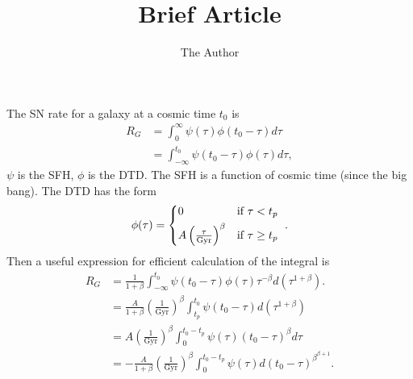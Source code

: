 \documentclass[11pt, oneside]{article}   	%
\title{Brief Article}
\author{The Author}
\begin{document}
\maketitle
The SN rate for a galaxy at a cosmic time $t_0$ is
\begin{align}
R_G &= \int_{0}^{\infty} \psi(\tau) \phi(t_0-\tau) d\tau \\
 &= \int_{-\infty}^{t_0} \psi(t_0-\tau) \phi(\tau) d\tau,
\end{align}
$\psi$ is the SFH, $\phi$ is the DTD. 
The SFH is a function of cosmic time (since the big bang).
The DTD has the form
\begin{equation}
\phi(\tau) =  
\begin{cases*} 
            0  &  if $\tau < t_p$  \\
             A \left(\frac{\tau}{\mathrm{Gyr}} \right)^\beta  & if $\tau \geq t_p$ 
          \end{cases*}.
\end{equation}
Then a useful expression for efficient calculation of the integral is
\begin{align}
R_G &= \frac{1}{1+\beta}  \int_{-\infty}^{t_0} \psi(t_0-\tau)  \phi(\tau)\tau^{-\beta}  d(\tau^{1+\beta}). \\
 &= \frac{A}{1+\beta}  \left(\frac{1}{\mathrm{Gyr}} \right)^\beta \int_{t_p}^{t_0} \psi(t_0-\tau) d(\tau^{1+\beta}) \\
 & = A   \left(\frac{1}{\mathrm{Gyr}} \right)^\beta  \int_{0}^{t_0-t_p} \psi(\tau) (t_0-\tau)^{\beta} d\tau \\
& = - \frac{A}{1+\beta}    \left(\frac{1}{\mathrm{Gyr}} \right)^\beta  \int_{0}^{t_0-t_p} \psi(\tau) d(t_0-\tau)^{\beta}^{\beta+1}  .
 \end{align}
\end{document}
